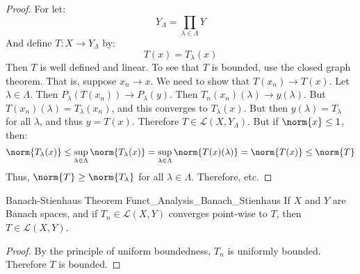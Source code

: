         \begin{proof}
            For let:
            \begin{equation}
                Y_{\Lambda}=\prod_{\lambda\in\Lambda}Y
            \end{equation}
            And define $T:X\rightarrow{Y}_{\Lambda}$ by:
            \begin{equation}
                T(x)=T_{\lambda}(x)
            \end{equation}
            Then $T$ is well defined and linear. To see
            that $T$ is bounded, use the closed graph
            theorem. That is, suppose $x_{n}\rightarrow{x}$.
            We need to show that $T(x_{n})\rightarrow{T}(x)$.
            Let $\lambda\in\Lambda$. Then
            $P_{\lambda}(T(x_{n}))\rightarrow{P}_{\lambda}(y)$.
            Then $T_{n}(x_{n})(\lambda)\rightarrow{y}(\lambda)$.
            But $T(x_{n})(\lambda)=T_{\lambda}(x_{n})$, and this
            converges to $T_{\lambda}(x)$. But then
            $y(\lambda)=T_{\lambda}$ for all $\lambda$, and
            thus $y=T(x)$. Therefore
            $T\in\mathcal{L}(X,Y_{\Lambda})$. But if
            $\norm{x}\leq{1}$, then:
            \begin{equation}
                \norm{T_{\lambda}(x)}\leq
                \sup_{\lambda\in\Lambda}\norm{T_{\lambda}(x)}
                =\sup_{\lambda\in\Lambda}\norm{T(x)(\lambda)}
                =\norm{T(x)}\leq\norm{T}
            \end{equation}
            Thus, $\norm{T}\geq\norm{T_{\lambda}}$ for all
            $\lambda\in\Lambda$. Therefore, etc.
        \end{proof}
        \begin{ltheorem}{Banach-Stienhaus Theorem}
              {Funct_Analysis_Banach_Stienhaus}
            If $X$ and $Y$ are Banach spaces, and if
            $T_{n}\in\mathcal{L}(X,Y)$ converges point-wise to
            $T$, then $T\in\mathcal{L}(X,Y)$.
        \end{ltheorem}
        \begin{proof}
            By the principle of uniform boundedness,
            $T_{n}$ is uniformly bounded. Therefore $T$ is bounded.
        \end{proof}
